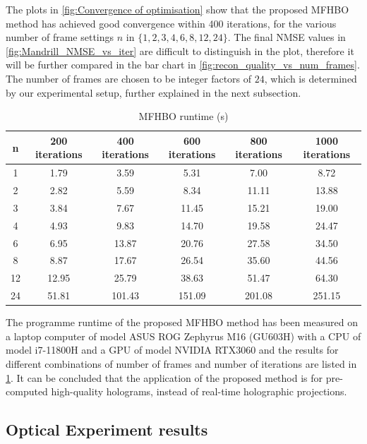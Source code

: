 	The plots in \cref{fig:Convergence of optimisation} show that the proposed MFHBO method has achieved good convergence within 400 iterations, for the various number of frame settings $n$ in $\{1, 2, 3, 4, 6, 8, 12, 24\}$. The final NMSE values in \cref{fig:Mandrill_NMSE_vs_iter} are difficult to distinguish in the plot, therefore it will be further compared in the bar chart in \cref{fig:recon_quality_vs_num_frames}. The number of frames are chosen to be integer factors of $24$, which is determined by our experimental setup, further explained in the next subsection.


	\begin{table}[H]
	\centering
	\begin{tabular}{|c|c|c|c|c|c|}
	\hline
	\textbf{n} & \textbf{200 iterations} & \textbf{400 iterations} & \textbf{600 iterations} & \textbf{800 iterations} & \textbf{1000 iterations} \\ \hline
	1 & 1.79 & 3.59 & 5.31 & 7.00 & 8.72 \\ \hline
	2 & 2.82 & 5.59 & 8.34 & 11.11 & 13.88 \\ \hline
	3 & 3.84 & 7.67 & 11.45 & 15.21 & 19.00 \\ \hline
	4 & 4.93 & 9.83 & 14.70 & 19.58 & 24.47 \\ \hline
	6 & 6.95 & 13.87 & 20.76 & 27.58 & 34.50 \\ \hline
	8 & 8.87 & 17.67 & 26.54 & 35.60 & 44.56 \\ \hline
	12 & 12.95 & 25.79 & 38.63 & 51.47 & 64.30 \\ \hline
	24 & 51.81 & 101.43 & 151.09 & 201.08 & 251.15 \\ \hline
	\end{tabular}
	\caption{MFHBO runtime (s)}
	\label{tab:MFHBO runtime}
	\end{table}

	The programme runtime of the proposed MFHBO method has been measured on a laptop computer of model ASUS ROG Zephyrus M16 (GU603H) with a CPU of model i7-11800H and a GPU of model NVIDIA RTX3060 and the results for different combinations of number of frames and number of iterations are listed in \cref{tab:MFHBO runtime}. It can be concluded that the application of the proposed method is for pre-computed high-quality holograms, instead of real-time holographic projections.



\subsection{Optical Experiment results}

